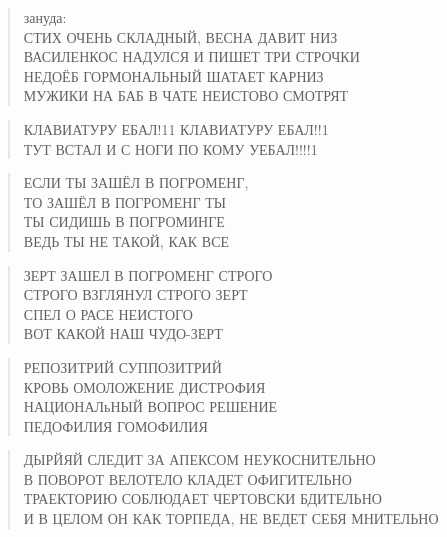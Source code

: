\poemtitle{***}
\begin{verse}
зануда: \\
СТИХ ОЧЕНЬ СКЛАДНЫЙ, ВЕСНА ДАВИТ НИЗ\\
ВАСИЛЕНКОС НАДУЛСЯ И ПИШЕТ ТРИ СТРОЧКИ\\
НЕДОЁБ ГОРМОНАЛЬНЫЙ  ШАТАЕТ КАРНИЗ\\
МУЖИКИ НА БАБ В ЧАТЕ НЕИСТОВО СМОТРЯТ
\end{verse}

\poemtitle{***}
\begin{verse}
КЛАВИАТУРУ ЕБАЛ!11 КЛАВИАТУРУ ЕБАЛ!!1\\
ТУТ ВСТАЛ И С НОГИ ПО КОМУ УЕБАЛ!!!!1
\end{verse}

\poemtitle{***}
\begin{verse}
ЕСЛИ ТЫ ЗАШЁЛ В ПОГРОМЕНГ,\\
ТО ЗАШЁЛ В ПОГРОМЕНГ ТЫ\\
ТЫ СИДИШЬ В ПОГРОМИНГЕ\\
ВЕДЬ ТЫ НЕ ТАКОЙ, КАК ВСЕ
\end{verse}

\poemtitle{***}
\begin{verse}
ЗЕРТ ЗАШЕЛ В ПОГРОМЕНГ СТРОГО\\
СТРОГО ВЗГЛЯНУЛ СТРОГО ЗЕРТ\\
СПЕЛ О РАСЕ НЕИСТОГО\\
ВОТ КАКОЙ НАШ ЧУДО-ЗЕРТ
\end{verse}

\poemtitle{***}
\begin{verse}
РЕПОЗИТРИЙ СУППОЗИТРИЙ\\
КРОВЬ ОМОЛОЖЕНИЕ ДИСТРОФИЯ\\
НАЦИОНАЛьНЫЙ ВОПРОС РЕШЕНИЕ\\
ПЕДОФИЛИЯ ГОМОФИЛИЯ
\end{verse}

\poemtitle{***}
\begin{verse}
ДЫРЙЯЙ СЛЕДИТ ЗА АПЕКСОМ НЕУКОСНИТЕЛЬНО\\
В ПОВОРОТ ВЕЛОТЕЛО КЛАДЕТ ОФИГИТЕЛЬНО\\
ТРАЕКТОРИЮ СОБЛЮДАЕТ ЧЕРТОВСКИ БДИТЕЛЬНО\\
И В ЦЕЛОМ ОН КАК ТОРПЕДА, НЕ ВЕДЕТ СЕБЯ МНИТЕЛЬНО
\end{verse}

